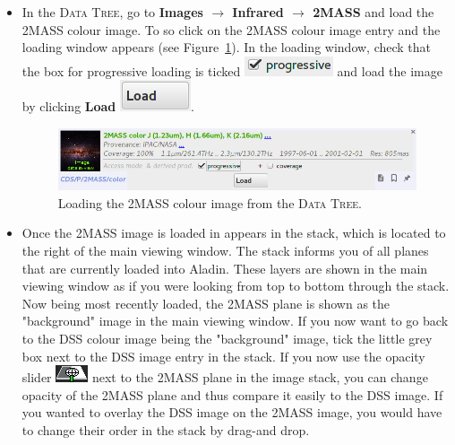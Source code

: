 \documentclass [a4paper, 12pt]{article}
\newcommand{\aladin}{{\textsc{A}{ladin}}}
\begin{document}
\begin{itemize}
    \item In the \textsc{Data Tree}, go to \textbf{Images $\rightarrow$ 
Infrared $\rightarrow$ 2MASS} and load the 2MASS colour image. To so click on 
the 2MASS colour image entry and the loading window appears (see 
Figure~\ref{fig:aladin_load_2mass}). In the loading window, check that the box 
for progressive loading is ticked \includegraphics[width=0.07   
\textwidth]{../images/aladin_load_progessive.png} and load the image by 
clicking \textbf{Load}  \includegraphics[width=0.07   
\textwidth]{../images/aladin_load_load.png}.

\begin{figure}[H]
    \center
    \includegraphics[width=1  
    \textwidth]{../images/aladin_load_2mass-rgb-image.png}
    \caption{Loading the 2MASS colour image from the \textsc{Data Tree}. }
    \label{fig:aladin_load_2mass}
\end{figure}

    \item Once the 2MASS image is loaded in appears in the stack, which is 
    located to the right of the main viewing window. The stack informs you of 
    all planes that are currently loaded into \aladin. These layers are shown 
    in the main viewing window as if you were looking from top to bottom 
    through the stack. Now being most recently loaded, the 2MASS plane is shown 
    as the "background" image in the main viewing window. If you now want to go 
    back to the DSS colour image being the "background" image, tick the little 
    grey box next to the DSS image entry in the stack. If you now use the 
    opacity slider \includegraphics[width=0.035  
    \textwidth]{../images/aladin_button_opacity.png} next to the 2MASS plane in 
    the image stack, you can change opacity of the 2MASS plane and thus compare 
    it easily to the DSS image. If you wanted to overlay the DSS image on the 
    2MASS image, you would have to change their order in the stack by drag-and 
    drop. 


\end{itemize}
\end{document}

